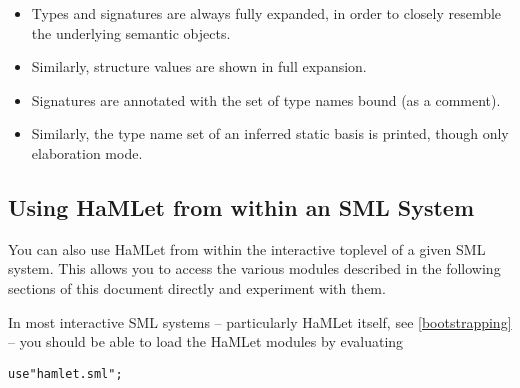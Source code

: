 \documentclass[twoside,titlepage]{article}
\begin{document}
\begin{itemize}
\item Types and signatures are always fully expanded, in order to closely resemble the underlying semantic objects.
\item Similarly, structure values are shown in full expansion.
\item Signatures are annotated with the set of type names bound (as a comment).
\item Similarly, the type name set of an inferred static basis is printed, though only elaboration mode.
\end{itemize}

%
%


\subsection{Using HaMLet from within an SML System}
\label{usingembedded}

You can also use HaMLet from within the interactive toplevel of a given SML system. This allows you to access the various modules described in the following sections of this document directly and experiment with them.

In most interactive SML systems -- particularly HaMLet itself, see \ref{bootstrapping} -- you should be able to load the HaMLet modules by evaluating

\begin{quoting}
\begin{alltt}
use "hamlet.sml";
\end{alltt}
\end{quoting}
\end{document}
